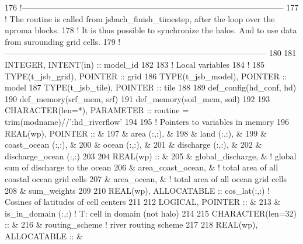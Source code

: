 \begin{DoxyCode}
176   \textcolor{comment}{!------------------------------------------------------------------------------------------------}
177   \textcolor{comment}{! The routine is called from jsbach\_finish\_timestep, after the loop over the nproma blocks.}
178   \textcolor{comment}{! It is thus possible to synchronize the halos. And to use data from surounding grid cells.}
179   \textcolor{comment}{!------------------------------------------------------------------------------------------------}
180 
181     \textcolor{keywordtype}{INTEGER}, \textcolor{keywordtype}{INTENT(in)} :: model\_id
182 
183     \textcolor{comment}{! Local variables}
184     \textcolor{comment}{!}
185     \textcolor{keywordtype}{TYPE}(t\_jsb\_grid),  \textcolor{keywordtype}{POINTER}    :: grid
186     \textcolor{keywordtype}{TYPE}(t\_jsb\_model), \textcolor{keywordtype}{POINTER}    :: model
187     \textcolor{keywordtype}{TYPE}(t\_jsb\_tile),  \textcolor{keywordtype}{POINTER}    :: tile
188 
189     def\_config(hd\_conf, hd)
190     def\_memory(srf\_mem, srf)
191     def\_memory(soil\_mem, soil)
192 
193     \textcolor{keywordtype}{CHARACTER(len=*)},  \textcolor{keywordtype}{PARAMETER}  :: routine = trim(modname)//\textcolor{stringliteral}{':hd\_riverflow'}
194 
195     \textcolor{comment}{! Pointers to variables in memory}
196     \textcolor{keywordtype}{REAL(wp)}, \textcolor{keywordtype}{POINTER} ::   &
197       & area            (:,:), &
198       & land            (:,:), &
199       & coast\_ocean     (:,:), &
200       & ocean           (:,:), &
201       & discharge       (:,:), &
202       & discharge\_ocean (:,:)
203 
204     \textcolor{keywordtype}{REAL(wp)} ::            &
205       & global\_discharge,  &  \textcolor{comment}{! global sum of discharge to the ocean}
206       & area\_coast\_ocean,  &  \textcolor{comment}{! total area of all coastal ocean grid cells}
207       & area\_ocean,        &  \textcolor{comment}{! total area of all ocean grid cells}
208       & sum\_weights
209 
210     \textcolor{keywordtype}{REAL(wp)}, \textcolor{keywordtype}{ALLOCATABLE} :: cos\_lat(:,:) \textcolor{comment}{! Cosines of latitudes of cell centers}
211 
212     \textcolor{keywordtype}{LOGICAL}, \textcolor{keywordtype}{POINTER}  ::   &
213       & is\_in\_domain    (:,:) \textcolor{comment}{! T: cell in domain (not halo)}
214 
215     \textcolor{keywordtype}{CHARACTER(len=32)} :: &
216       & routing\_scheme        \textcolor{comment}{! river routing scheme}
217 
218     \textcolor{keywordtype}{REAL(wp)}, \textcolor{keywordtype}{ALLOCATABLE}  ::   &

\end{DoxyCode}
